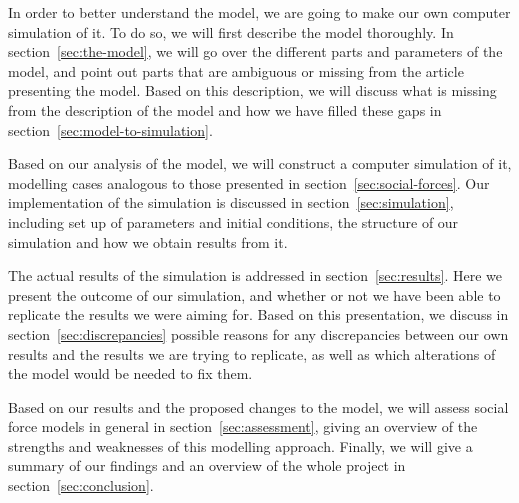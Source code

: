 In order to better understand the model, we are going to make our own computer 
simulation of it. To do so, we will first describe the model thoroughly. In 
section~\ref{sec:the-model}, we will go over the different parts and 
parameters of the model, and point out parts that are ambiguous or missing 
from the article presenting the model.  Based on this description, we will 
discuss what is missing from the description of the model and how we have 
filled these gaps in section~\ref{sec:model-to-simulation}.

Based on our analysis of the model, we will construct a computer simulation of 
it, modelling cases analogous to those presented in 
section~\ref{sec:social-forces}. Our implementation of the 
simulation is discussed in section~\ref{sec:simulation}, including set up of 
parameters and initial conditions, the structure of our simulation and how we 
obtain results from it.

The actual results of the simulation is addressed in 
section~\ref{sec:results}. Here we present the outcome of our simulation, and 
whether or not we have been able to replicate the results we were aiming for.  
Based on this presentation, we discuss in section~\ref{sec:discrepancies} 
possible reasons for any discrepancies between our own results and the results 
we are trying to replicate, as well as which alterations of the model would 
be needed to fix them.

Based on our results and the proposed changes to the model, we will assess 
social force models in general in section~\ref{sec:assessment}, giving an 
overview of the strengths and weaknesses of this modelling approach. Finally, 
we will give a summary of our findings and an overview of the whole project in 
section~\ref{sec:conclusion}.
